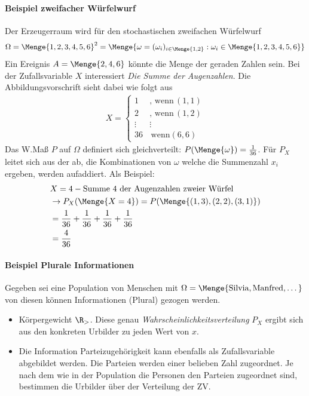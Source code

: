 \paragraph{Beispiel zweifacher Würfelwurf}
Der Erzeugerraum wird für den stochastischen zweifachen Würfelwurf
\begin{align*}
	\Omega = \Menge{1,2,3,4,5,6}^2 = \Menge{\omega = (\omega_i)_{i\in \Menge{1,2}}: \omega_i \in \Menge{1,2,3,4,5,6}}
\end{align*}
Ein Ereignis $A = \Menge{2,4,6}$ könnte die Menge der geraden Zahlen sein. Bei der Zufallsvariable $X$ interessiert \textit{Die Summe der Augenzahlen}. Die Abbildungsvorschrift sieht dabei wie folgt aus
\begin{align*}
	X = \begin{cases}
		1 &,\, \text{wenn}\, (1,1)\\
		2 &,\, \text{wenn}\, (1,2)\\
		\vdots & \vdots \\
		36 &\, \text{wenn} (6,6)
	\end{cases}
\end{align*}
Das \gls{W.}Maß $P$ auf $\Omega$ definiert sich gleichverteilt: $P(\Menge{\omega}) = \frac{1}{36}$. Für $P_X$ leitet sich aus der  ab, die Kombinationen von $\omega$ welche die Summenzahl $x_i$ ergeben, werden aufaddiert. Als Beispiel: 
\begin{align*}
	&X = 4 - \text{Summe 4 der Augenzahlen zweier Würfel}\\
	&\rightarrow P_X(\Menge{X=4}) = P(\Menge{(1,3), (2,2), (3,1)}) \\
	&= \frac{1}{36} + \frac{1}{36} + \frac{1}{36} + \frac{1}{36}\\
	&= \frac{4}{36}
\end{align*}

\paragraph{Beispiel Plurale Informationen}
Gegeben sei eine Population von Menschen mit $\Omega = \Menge{\text{Silvia}, \text{Manfred}, \dots}$ von diesen können Informationen (Plural) gezogen werden. 
\begin{itemize}
	\item Körpergewicht $\R_{>}$. Diese genau \textit{Wahrscheinlichkeitsverteilung} $P_X$ ergibt sich aus den konkreten Urbilder zu jeden Wert von $x$.
	\item Die Information Parteizugehörigkeit kann ebenfalls als Zufallsvariable abgebildet werden. Die Parteien werden einer belieben Zahl zugeordnet. Je nach dem wie in der Population die Personen den Parteien zugeordnet sind, bestimmen die Urbilder über der Verteilung der \gls{ZV}.
\end{itemize}

